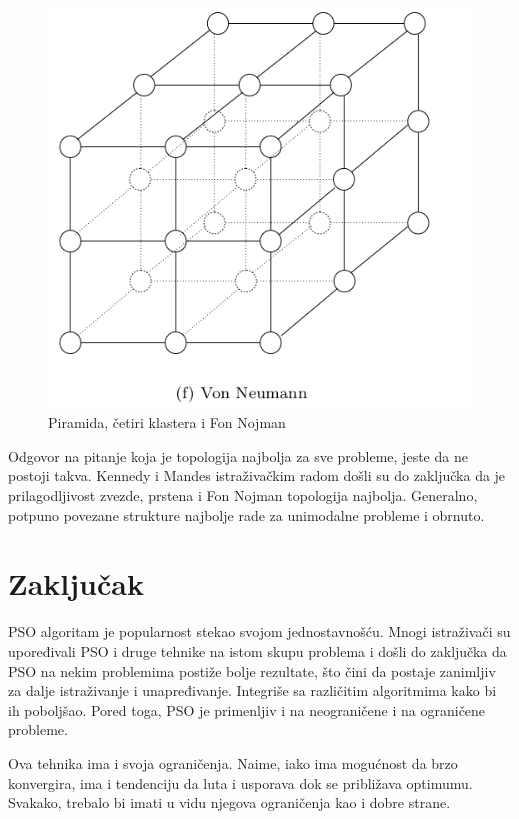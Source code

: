 \documentclass[a4paper]{article}
\begin{document}
\begin{figure}[htp]
    \includegraphics[scale=0.15]{VonNeumann.png}
    \caption{Piramida, četiri klastera i Fon Nojman}
    \label{fig:PiramidaCetiriKlasteraFonNojman}
\end{figure}
Odgovor na pitanje koja je topologija najbolja za sve probleme, jeste da ne postoji takva.
Kennedy i Mandes istraživačkim radom došli su do zaključka da je prilagodljivost zvezde, prstena i Fon Nojman topologija najbolja. \cite{wang2018particle} Generalno, potpuno povezane strukture najbolje rade za unimodalne probleme i obrnuto.

\section{Zaključak}

PSO algoritam je popularnost stekao svojom jednostavnošću. Mnogi istraživači su upoređivali PSO i druge tehnike na istom skupu problema i došli do zaključka da PSO  na nekim problemima postiže bolje rezultate, što čini da postaje zanimljiv za dalje istraživanje i unapređivanje. Integriše sa različitim algoritmima kako bi ih poboljšao. Pored toga, PSO je primenljiv i na neograničene i na ograničene probleme.

Ova tehnika ima i svoja ograničenja. Naime, iako ima mogućnost da brzo konvergira, ima i tendenciju da luta i usporava dok se približava optimumu. Svakako, trebalo bi imati u vidu njegova ograničenja kao i dobre strane.


\appendix
 

\end{document}
